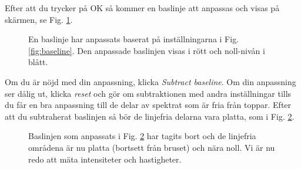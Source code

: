\documentclass[11pt,swedish,a4paper]{article}
\begin{document}
Efter att du trycker på OK så kommer en baslinje att anpassas och visas på skärmen,
se Fig. 
\ref{fig:baselinefit}.
\begin{figure}[h!]
  \centering
  \caption{En baslinje har anpassats baserat på inställningarna i 
	  Fig.  \ref{fig:baseline}. Den anpassade baslinjen visas i rött
	  och noll-nivån i blått.
  }
  \label{fig:baselinefit}
\end{figure}
Om du är nöjd med din anpassning, klicka \emph{Subtract baseline}. Om din anpassning
ser dålig ut, klicka \emph{reset} och gör om subtraktionen med andra inställningar 
tills du får en bra anpassning till de delar av spektrat som är fria från toppar.
Efter att du subtraherat baslinjen så bör de linjefria delarna vara platta, som i Fig. 
\ref{fig:baselinesubtracted}.
\begin{figure}[h!]
  \centering
  \caption{Baslinjen som anpassats i Fig. \ref{fig:baselinesubtracted} har tagits bort
	  och de linjefria områdena är nu platta (bortsett från bruset) och nära noll. Vi
	  är nu redo att mäta intensiteter och hastigheter.
	  }
  \label{fig:baselinesubtracted}
\end{figure}
\end{document}
